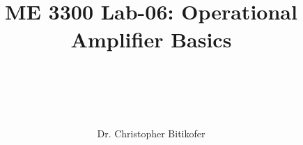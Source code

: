 
\title{
\begin{center}
\HRule \\[0.4cm]
{\Huge \bfseries ME 3300 Lab-06: 
Operational Amplifier Basics \\[0.5cm] 
}\\[0.4cm] %
\HRule \\[1.5cm]
\end{center}
}
\author{\Large Dr. Christopher Bitikofer \\ \\ \\[.1cm]} %
\date{} %

\maketitle
\tableofcontents